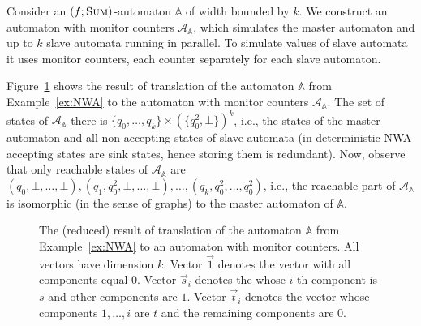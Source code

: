 \documentclass{lmcs}
\newcommand{\nestedA}{\mathbb{A}}
\newcommand{\fsum}{\textsc{Sum}}
\newcommand{\aut}{\mathcal{A}}
\begin{document}
\begin{exa}
Consider an $(f;\fsum)$-automaton $\nestedA$ of width bounded by $k$.
We construct an automaton with monitor counters $\aut_{\nestedA}$, which
simulates the master automaton and up to $k$ slave automata running in parallel.
To simulate values of slave automata it uses monitor counters, each counter separately for each slave automaton.

Figure~\ref{fig:NWAtoAMC} shows the result of translation of  the automaton $\nestedA$ from Example~\ref{ex:NWA}
to the automaton with monitor counters $\aut_{\nestedA}$. The set of states of $\aut_{\nestedA}$ there is
$\{q_0, \ldots, q_k\} \times {(\{q_0^2, \bot\})}^k$, i.e.,
the states of the master automaton and all non-accepting states of slave automata (in deterministic NWA accepting states are sink states, hence storing them is redundant).
Now, observe that only reachable states of $\aut_{\nestedA}$ are $(q_0, \bot, \ldots, \bot), (q_1, q_0^2, \bot, \ldots, \bot), \ldots, (q_k, q_0^2, \ldots, q_0^2)$, i.e., the reachable part of
$\aut_{\nestedA}$ is isomorphic (in the sense of graphs) to the master automaton of $\nestedA$.

\begin{figure}
\centering
{}
\caption{The (reduced) result of translation of the automaton $\nestedA$ from  Example~\ref{ex:NWA} to an automaton with monitor counters. All vectors have dimension $k$.
Vector $\vec{1}$ denotes the vector with all components equal $0$.
Vector $\vec{s}_i$ denotes the whose $i$-th component is $s$ and other components are $1$.
Vector $\vec{t}_i$ denotes the vector whose components $1, \ldots, i$ are $t$ and the remaining components are $0$.
}\label{fig:NWAtoAMC}
\end{figure}
\end{exa}
\end{document}
